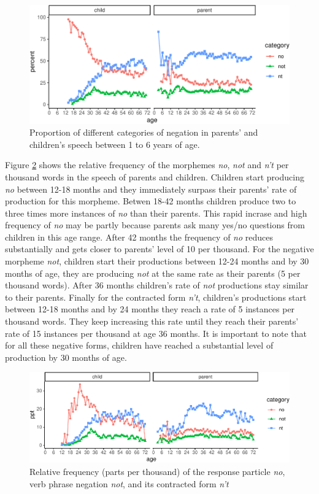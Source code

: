 \documentclass[man,floatsintext,draftall]{apa6}
\begin{document}
\begin{figure}
\centering
\includegraphics{negation_production_files/figure-latex/negationProportionPlot-1.pdf}
\caption{\label{fig:negationProportionPlot}Proportion of different categories of negation in parents' and children's speech between 1 to 6 years of age.}
\end{figure}

Figure \ref{fig:negationRelativeFrequency} shows the relative frequency of the morphemes \emph{no}, \emph{not} and \emph{n't} per thousand words in the speech of parents and children. Children start producing \emph{no} between 12-18 months and they immediately surpass their parents' rate of production for this morpheme. Betwen 18-42 months children produce two to three times more instances of \emph{no} than their parents. This rapid incrase and high frequency of \emph{no} may be partly because parents ask many yes/no questions from children in this age range. After 42 months the frequency of \emph{no} reduces substantially and gets closer to parents' level of 10 per thousand. For the negative morpheme \emph{not}, children start their productions between 12-24 months and by 30 months of age, they are producing \emph{not} at the same rate as their parents (5 per thousand words). After 36 months children's rate of \emph{not} productions stay similar to their parents. Finally for the contracted form \emph{n't}, children's productions start between 12-18 months and by 24 months they reach a rate of 5 instances per thousand words. They keep increasing this rate until they reach their parents' rate of 15 instances per thousand at age 36 months. It is important to note that for all these negative forms, children have reached a substantial level of production by 30 months of age.

\begin{figure}
\centering
\includegraphics{negation_production_files/figure-latex/negationRelativeFrequency-1.pdf}
\caption{\label{fig:negationRelativeFrequency}Relative frequency (parts per thousand) of the response particle \emph{no}, verb phrase negation \emph{not}, and its contracted form \emph{n't}}
\end{figure}
\end{document}
